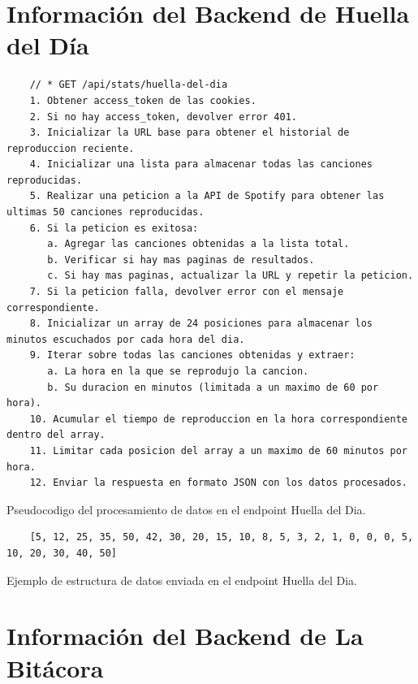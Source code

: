 \section{Información del Backend de Huella del Día} \label{sec:backend_huella_del_dia}

\begin{ifalgorithm}[H]
    \begin{lstlisting}
    // * GET /api/stats/huella-del-dia
    1. Obtener access_token de las cookies.
    2. Si no hay access_token, devolver error 401.
    3. Inicializar la URL base para obtener el historial de reproduccion reciente.
    4. Inicializar una lista para almacenar todas las canciones reproducidas.
    5. Realizar una peticion a la API de Spotify para obtener las ultimas 50 canciones reproducidas.
    6. Si la peticion es exitosa:
       a. Agregar las canciones obtenidas a la lista total.
       b. Verificar si hay mas paginas de resultados.
       c. Si hay mas paginas, actualizar la URL y repetir la peticion.
    7. Si la peticion falla, devolver error con el mensaje correspondiente.
    8. Inicializar un array de 24 posiciones para almacenar los minutos escuchados por cada hora del dia.
    9. Iterar sobre todas las canciones obtenidas y extraer:
       a. La hora en la que se reprodujo la cancion.
       b. Su duracion en minutos (limitada a un maximo de 60 por hora).
    10. Acumular el tiempo de reproduccion en la hora correspondiente dentro del array.
    11. Limitar cada posicion del array a un maximo de 60 minutos por hora.
    12. Enviar la respuesta en formato JSON con los datos procesados.
    \end{lstlisting}
    \caption{Pseudocodigo del procesamiento de datos en el endpoint Huella del Dia.}
    \label{alg:huella_del_dia}
\end{ifalgorithm}

\begin{ifalgorithm}[H]
    \begin{lstlisting}
    [5, 12, 25, 35, 50, 42, 30, 20, 15, 10, 8, 5, 3, 2, 1, 0, 0, 0, 5, 10, 20, 30, 40, 50]
    \end{lstlisting}
    \caption{Ejemplo de estructura de datos enviada en el endpoint Huella del Dia.}
    \label{alg:huella_del_dia_response}
\end{ifalgorithm}

\section{Información del Backend de La Bitácora} \label{sec:backend_la_bitacora}

